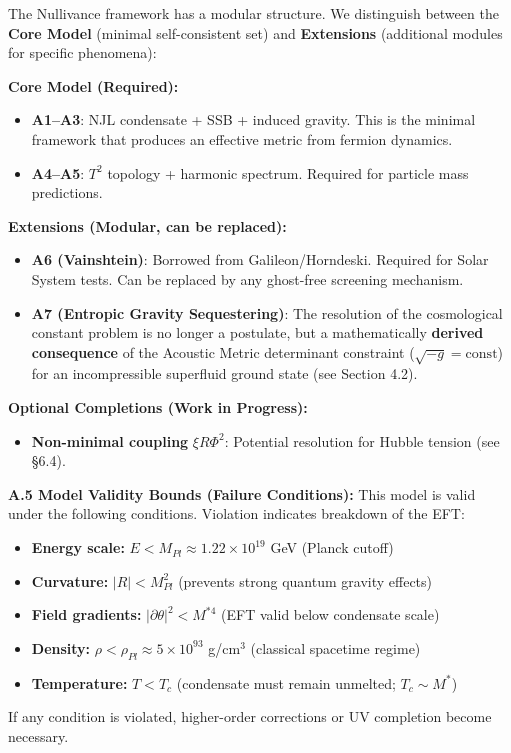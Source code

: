 \documentclass[a4paper,12pt]{article}
\begin{document}
The Nullivance framework has a modular structure. We distinguish between the \textbf{Core Model} (minimal self-consistent set) and \textbf{Extensions} (additional modules for specific phenomena):

\textbf{Core Model (Required):}
\begin{itemize}
\item \textbf{A1--A3}: NJL condensate + SSB + induced gravity. This is the minimal framework that produces an effective metric from fermion dynamics.
\item \textbf{A4--A5}: $T^2$ topology + harmonic spectrum. Required for particle mass predictions.
\end{itemize}

\textbf{Extensions (Modular, can be replaced):}
\begin{itemize}
\item \textbf{A6 (Vainshtein)}: Borrowed from Galileon/Horndeski. Required for Solar System tests. Can be replaced by any ghost-free screening mechanism.
\item \textbf{A7 (Entropic Gravity Sequestering)}: The resolution of the cosmological constant problem is no longer a postulate, but a mathematically \textbf{derived consequence} of the Acoustic Metric determinant constraint ($\sqrt{-g} = \text{const}$) for an incompressible superfluid ground state (see Section 4.2).
\end{itemize}

\textbf{Optional Completions (Work in Progress):}
\begin{itemize}
\item \textbf{Non-minimal coupling} $\xi R\Phi^2$: Potential resolution for Hubble tension (see §6.4).
\end{itemize}

\textbf{A.5 Model Validity Bounds (Failure Conditions):}
This model is valid under the following conditions. Violation indicates breakdown of the EFT:
\begin{itemize}
    \item \textbf{Energy scale:} $E < M_{Pl} \approx 1.22 \times 10^{19}$ GeV (Planck cutoff)
    \item \textbf{Curvature:} $|R| < M_{Pl}^2$ (prevents strong quantum gravity effects)
    \item \textbf{Field gradients:} $|\partial\theta|^2 < M^{*4}$ (EFT valid below condensate scale)
    \item \textbf{Density:} $\rho < \rho_{Pl} \approx 5 \times 10^{93}$ g/cm$^3$ (classical spacetime regime)
    \item \textbf{Temperature:} $T < T_c$ (condensate must remain unmelted; $T_c \sim M^*$)
\end{itemize}
If any condition is violated, higher-order corrections or UV completion become necessary.
\end{document}
